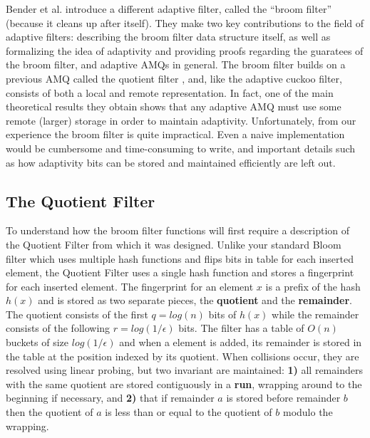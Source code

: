 \documentclass[../paper.tex]{subfiles}
\begin{document}
 Bender et al. \cite{broom-filter} introduce a different adaptive filter, called the ``broom filter''
(because it cleans up after itself). They make two key contributions to the
field of adaptive filters: describing the broom filter data structure itself,
as well as formalizing the idea of adaptivity and providing proofs regarding the guaratees
of the broom filter, and adaptive AMQs in general. The broom filter builds on
a previous AMQ called the quotient filter \cite{quotient-filter}, and, like the adaptive
cuckoo filter, consists of both a local and remote representation. In fact, one
of the main theoretical results they obtain shows that any adaptive AMQ must use
some remote (larger) storage in order to maintain adaptivity. Unfortunately, from
our experience the broom filter is quite impractical. Even a naive implementation
would be cumbersome and time-consuming to write, and important details such as
how adaptivity bits can be stored and maintained efficiently are left out.

\subsection{The Quotient Filter} To understand how the broom filter functions
will first require a description of the Quotient Filter from which it was
designed.   Unlike your standard Bloom filter which uses multiple hash
functions and flips bits in table for each inserted element, the Quotient
Filter uses a single hash function and stores a fingerprint for each inserted
element.  The fingerprint for an element $x$ is a prefix of the hash $h(x)$ and
is stored as two separate pieces, the {\bf quotient} and the {\bf remainder}.
The quotient consists of the first $q = log(n)$ bits of $h(x)$ while the
remainder consists of the following $r = log(1/\epsilon)$ bits.  The filter has
a table of $O(n)$ buckets of size $log(1/\epsilon)$ and when a element is
added, its remainder is stored in the table at the position indexed by its
quotient.  When collisions occur, they are resolved using linear probing, but
two invariant are maintained: {\bf 1)} all remainders with the same quotient
are stored contiguously in a {\bf run}, wrapping around to the beginning if
necessary, and {\bf 2)} that if remainder $a$ is stored before remainder $b$
then the quotient of $a$ is less than or equal to the quotient of $b$ modulo
the wrapping.  
\end{document}
